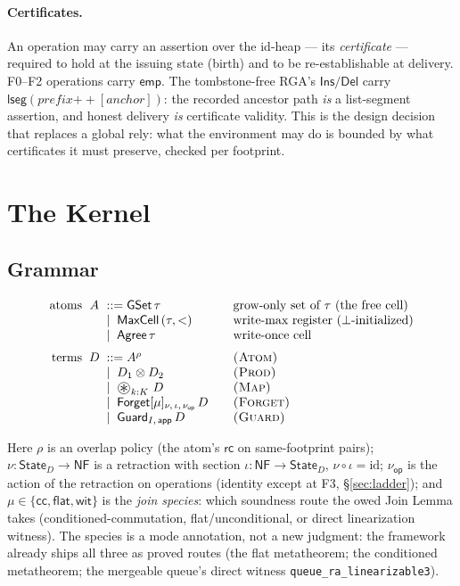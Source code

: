 \documentclass[11pt]{article}
\newcommand{\lean}[1]{\texttt{#1}}
\newcommand{\app}{\mathsf{app}}
\newcommand{\rc}{\mathsf{rc}}
\newcommand{\Forget}{\mathsf{Forget}}
\newcommand{\Guard}{\mathsf{Guard}}
\newcommand{\GSet}{\mathsf{GSet}}
\newcommand{\MaxCell}{\mathsf{MaxCell}}
\newcommand{\Agree}{\mathsf{Agree}}
\newcommand{\State}{\mathsf{State}}
\newcommand{\NF}{\mathsf{NF}}
\newcommand{\emp}{\mathsf{emp}}
\newcommand{\lseg}{\mathsf{lseg}}
\newcommand{\nuop}{\nu_{\mathsf{op}}}
\newcommand{\sepmap}{\mathop{\vcenter{\hbox{\Large$\circledast$}}}}
\newcommand{\cc}{\mathsf{cc}}
\renewcommand{\flat}{\mathsf{flat}}
\newcommand{\wit}{\mathsf{wit}}
\begin{document}
\paragraph{Certificates.} An operation may carry an assertion over the
id-heap --- its \emph{certificate} --- required to hold at the issuing
state (birth) and to be re-establishable at delivery. F0--F2 operations
carry $\emp$. The tombstone-free RGA's $\mathsf{Ins}/\mathsf{Del}$ carry
$\lseg(\mathit{prefix} \mathbin{+\!\!+} [\mathit{anchor}])$: the recorded
ancestor path \emph{is} a list-segment assertion, and honest delivery
\emph{is} certificate validity. This is the design decision that replaces
a global rely: what the environment may do is bounded by what certificates
it must preserve, checked per footprint.

\section{The Kernel}\label{sec:kernel}

\subsection{Grammar}

\[
\begin{array}{r@{\;\;}c@{\;\;}l@{\qquad}l}
\text{atoms} & A &::= \GSet\,\tau
  & \text{grow-only set of $\tau$ (the free cell)} \\
 & &\mid\; \MaxCell\,(\tau, <)
  & \text{write-max register ($\bot$-initialized)} \\
 & &\mid\; \Agree\,\tau
  & \text{write-once cell} \\[6pt]
\text{terms} & D &::= A^{\rho} & \textsc{(Atom)} \\
 & &\mid\; D_1 \otimes D_2 & \textsc{(Prod)} \\
 & &\mid\; \sepmap_{k : K}\, D & \textsc{(Map)} \\
 & &\mid\; \Forget[\mu]_{\nu,\,\iota,\,\nuop}\, D & \textsc{(Forget)} \\
 & &\mid\; \Guard_{I,\,\app}\, D & \textsc{(Guard)}
\end{array}
\]

Here $\rho$ is an overlap policy (the atom's $\rc$ on same-footprint
pairs); $\nu : \State_D \to \NF$ is a retraction with section
$\iota : \NF \to \State_D$, $\nu \circ \iota = \mathrm{id}$; $\nuop$ is
the action of the retraction on operations (identity except at F3,
\S\ref{sec:ladder}); and $\mu \in \{\cc, \flat, \wit\}$ is the \emph{join
species}: which soundness route the owed Join Lemma takes
(conditioned-commutation, flat/unconditional, or direct linearization
witness). The species is a mode annotation, not a new judgment: the
framework already ships all three as proved routes (the flat metatheorem;
the conditioned metatheorem; the mergeable queue's direct witness
\lean{queue\_ra\_linearizable3}).
\end{document}
